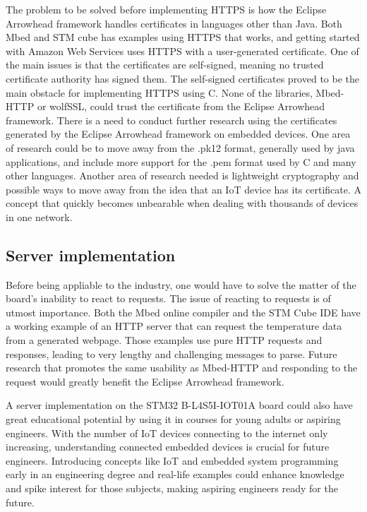 The problem to be solved before implementing HTTPS is how the Eclipse Arrowhead framework handles certificates in languages other than  Java.
Both Mbed and STM cube has examples using HTTPS that works, and getting started with Amazon Web Services uses HTTPS with a user-generated certificate.
One of the main issues is that the certificates are self-signed, meaning no trusted certificate authority has signed them. 
The self-signed certificates proved to be the main obstacle for implementing HTTPS using C. None of the libraries, Mbed-HTTP or wolfSSL, could trust the certificate from the Eclipse Arrowhead framework.
There is a need to conduct further research using the certificates generated by the Eclipse Arrowhead framework on embedded devices.
One area of research could be to move away from the .pk12 format, generally used by java applications, and include more support for the .pem format used by C and many other languages.
Another area of research needed is lightweight cryptography and possible ways to move away from the idea that an IoT device has its certificate.
A concept that quickly becomes unbearable when dealing with thousands of devices in one network.

\subsection{Server implementation}
Before being appliable to the industry, one would have to solve the matter of the board's inability to react to requests. 
The issue of reacting to requests is of utmost importance. 
Both the Mbed online compiler and the STM Cube IDE have a working example of an HTTP server that can request the temperature data from a generated webpage.
Those examples use pure HTTP requests and responses, leading to very lengthy and challenging messages to parse. 
Future research that promotes the same usability as Mbed-HTTP and responding to the request would greatly benefit the Eclipse Arrowhead framework.  

A server implementation on the STM32 B-L4S5I-IOT01A board could also have great educational potential by using it in courses for young adults or aspiring engineers.
With the number of IoT devices connecting to the internet only increasing, understanding connected embedded devices is crucial for future engineers. 
Introducing concepts like IoT and embedded system programming early in an engineering degree and real-life examples could enhance knowledge and spike interest for those subjects, making aspiring engineers ready for the future.  
